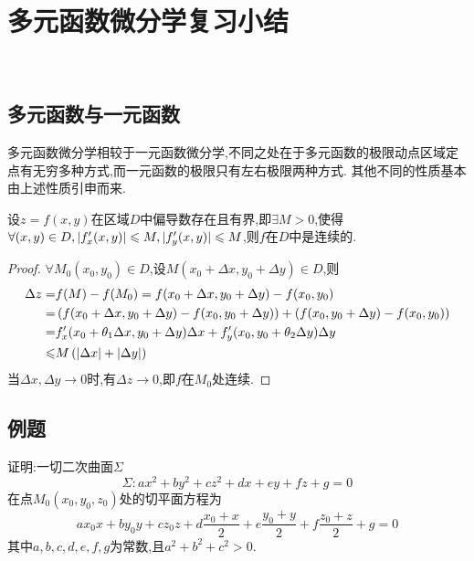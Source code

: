 \setcounter{chapter}{15} %

\chapter{多元函数微分学复习小结}\

\section{多元函数与一元函数}

多元函数微分学相较于一元函数微分学,不同之处在于多元函数的极限动点区域定点有无穷多种方式,而一元函数的极限只有左右极限两种方式.
其他不同的性质基本由上述性质引申而来.

\begin{example}
    设$z = f(x,y)$在区域$D$中偏导数存在且有界,即$\exists M > 0$,使得$\forall (x,y) \in D, |f_x'(x,y)| \leqslant M, |f_y'(x,y)| \leqslant M$,则$f$在$D$中是连续的.
\end{example}

\begin{proof}
    $\forall M_0(x_0,y_0) \in D$,设$M(x_0+ \Delta x,y_0+\Delta y) \in D$,则
    \begin{align*}
        \Delta z = &f(M) - f(M_0) = f(x_0 + \Delta x,y_0 + \Delta y) - f(x_0,y_0)\\
        = &\left( f(x_0 + \Delta x,y_0 + \Delta y) - f(x_0 , y_0 + \Delta y) \right) + \left( f(x_0 , y_0 + \Delta y) - f(x_0,y_0) \right)\\
        =& f_x'(x_0 +\theta_1 \Delta x,y_0 + \Delta y) \Delta x + f_y'(x_0,y_0 + \theta_2 \Delta y) \Delta y\\
        \leqslant& M \left( |\Delta x| + |\Delta y| \right)\\
    \end{align*}
    当$\Delta x, \Delta y \to 0$时,有$\Delta z \to 0$,即$f$在$M_0$处连续.
\end{proof}

\section{例题}

\begin{example}
    证明:一切二次曲面$\Sigma$
    $$\Sigma: ax^2 + by^2 + cz^2 + dx + ey + fz + g = 0$$
    在点$M_0(x_0,y_0,z_0)$处的切平面方程为
    $$ax_0x + by_0y + cz_0z + d\frac{x_0+x}{2} + e\frac{y_0+y}{2} + f\frac{z_0+z}{2} + g = 0$$
    其中$a,b,c,d,e,f,g$为常数,且$a^2+b^2+c^2>0$.
\end{example}

